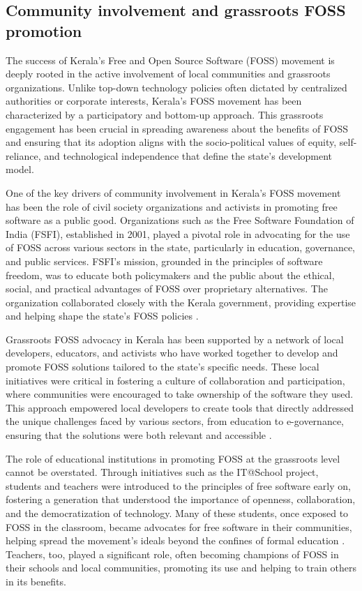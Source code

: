 \begin{refsection}
\subsection{Community involvement and grassroots FOSS promotion}

The success of Kerala's Free and Open Source Software (FOSS) movement is deeply rooted in the active involvement of local communities and grassroots organizations. Unlike top-down technology policies often dictated by centralized authorities or corporate interests, Kerala’s FOSS movement has been characterized by a participatory and bottom-up approach. This grassroots engagement has been crucial in spreading awareness about the benefits of FOSS and ensuring that its adoption aligns with the socio-political values of equity, self-reliance, and technological independence that define the state’s development model.

One of the key drivers of community involvement in Kerala's FOSS movement has been the role of civil society organizations and activists in promoting free software as a public good. Organizations such as the Free Software Foundation of India (FSFI), established in 2001, played a pivotal role in advocating for the use of FOSS across various sectors in the state, particularly in education, governance, and public services. FSFI's mission, grounded in the principles of software freedom, was to educate both policymakers and the public about the ethical, social, and practical advantages of FOSS over proprietary alternatives. The organization collaborated closely with the Kerala government, providing expertise and helping shape the state's FOSS policies \cite[pp.~11-13]{palackal2007information}.

Grassroots FOSS advocacy in Kerala has been supported by a network of local developers, educators, and activists who have worked together to develop and promote FOSS solutions tailored to the state’s specific needs. These local initiatives were critical in fostering a culture of collaboration and participation, where communities were encouraged to take ownership of the software they used. This approach empowered local developers to create tools that directly addressed the unique challenges faced by various sectors, from education to e-governance, ensuring that the solutions were both relevant and accessible \cite[pp.~156-159]{palackal2007information}.

The role of educational institutions in promoting FOSS at the grassroots level cannot be overstated. Through initiatives such as the IT@School project, students and teachers were introduced to the principles of free software early on, fostering a generation that understood the importance of openness, collaboration, and the democratization of technology. Many of these students, once exposed to FOSS in the classroom, became advocates for free software in their communities, helping spread the movement's ideals beyond the confines of formal education \cite[pp.~15-18]{prabhakar2010itschool}. Teachers, too, played a significant role, often becoming champions of FOSS in their schools and local communities, promoting its use and helping to train others in its benefits.


\end{refsection}
